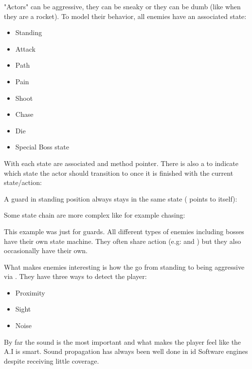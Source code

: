 "Actors" can be aggressive, they can be sneaky or they can be dumb (like when they are a rocket). To model their behavior, all enemies have an associated state:
\begin{itemize}
\item Standing
\item Attack
\item Path
\item Pain
\item Shoot
\item Chase
\item Die
\item Special Boss state
\end{itemize}

With each state are associated  and  method pointer. There is also a  to indicate which state the actor should transition to once it is finished with the current state/action:\\
\par
\begin{minipage}{\textwidth}

\end{minipage}
\par


A guard in standing position always stays in the same state ( points to itself):\\
\par

\begin{minipage}{\textwidth}

\end{minipage}
\par
Some state chain are more complex like for example chasing:\\

\par
\begin{minipage}{\textwidth}

\end{minipage}
\par
This example was just for guards. All different types of enemies including bosses have their own state machine. They often share action (e.g:  and ) but they also occasionally have their own.\\

\par
What makes enemies interesting is how the go from standing to being aggressive via . They have three ways to detect the player:\\
\begin{itemize}
\item Proximity
\item Sight
\item Noise
\end{itemize}
By far the sound is the most important and what makes the player feel like the A.I is smart. Sound propagation has always been well done in id Software engines despite receiving little coverage.





